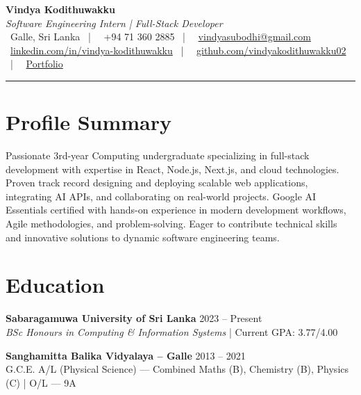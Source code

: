 \documentclass[letterpaper,10pt]{article}
\begin{document}
\begin{center}
{\Huge\color{accentTitle}\textbf{Vindya Kodithuwakku}}\\[3pt]
{\large\textit{Software Engineering Intern | Full-Stack Developer}}\\[4pt]
\faMapMarker*~Galle, Sri Lanka ~|~
\faPhone~+94 71 360 2885 ~|~
\faEnvelope~\href{mailto:vindyasubodhi@gmail.com}{vindyasubodhi@gmail.com}\\[1pt]
\faLinkedin~\href{https://www.linkedin.com/in/vindya-kodithuwakku-bb6187202}{linkedin.com/in/vindya-kodithuwakku} ~|~
\faGithub~\href{https://github.com/vindyakodithuwakku02}{github.com/vindyakodithuwakku02} ~|~
\faGlobe~\href{https://vindyakodithuwakku02.github.io/my_portfolio/}{Portfolio}\\[4pt]
{\color{accentLine}\hrule}
\end{center}

\section{Profile Summary}
\vspace{-1pt}
Passionate 3rd-year Computing undergraduate specializing in full-stack development with expertise in React, Node.js, Next.js, and cloud technologies. Proven track record designing and deploying scalable web applications, integrating AI APIs, and collaborating on real-world projects. Google AI Essentials certified with hands-on experience in modern development workflows, Agile methodologies, and problem-solving. Eager to contribute technical skills and innovative solutions to dynamic software engineering teams.

\section{Education}
\vspace{-1pt}

\textbf{Sabaragamuwa University of Sri Lanka} \hfill 2023 – Present\\
\textit{BSc Honours in Computing \& Information Systems} | Current GPA: 3.77/4.00

\vspace{2pt}
\textbf{Sanghamitta Balika Vidyalaya – Galle} \hfill 2013 – 2021\\
G.C.E. A/L (Physical Science) — Combined Maths (B), Chemistry (B), Physics (C) | O/L — 9A
\end{document}
